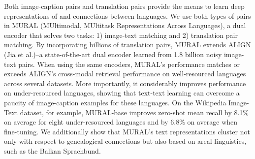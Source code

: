 Both image-caption pairs and translation pairs provide the means to learn deep representations of and connections between languages. We use both types of pairs in MURAL (MUltimodal, MUltitask Representations Across Languages), a dual encoder that solves two tasks: 1) image-text matching and 2) translation pair matching. By incorporating billions of translation pairs, MURAL extends ALIGN (Jia et al.)--a state-of-the-art dual encoder learned from 1.8 billion noisy image-text pairs. When using the same encoders, MURAL's performance matches or exceeds ALIGN's cross-modal retrieval performance on well-resourced languages across several datasets. More importantly, it considerably improves performance on under-resourced languages, showing that text-text learning can overcome a paucity of image-caption examples for these languages. On the Wikipedia Image-Text dataset, for example, MURAL-base improves zero-shot mean recall by 8.1\% on average for eight under-resourced languages and by 6.8\% on average when fine-tuning. We additionally show that MURAL's text representations cluster not only with respect to genealogical connections but also based on areal linguistics, such as the Balkan Sprachbund.
